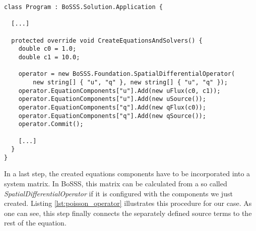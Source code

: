 \begin{lstlisting}[caption=Assembly of the DG operator for the poisson 
equation, label=lst:poisson_operator]
class Program : BoSSS.Solution.Application {

  [...]
  
  protected override void CreateEquationsAndSolvers() {
    double c0 = 1.0;
    double c1 = 10.0;

    operator = new BoSSS.Foundation.SpatialDifferentialOperator(
    	new string[] { "u", "q" }, new string[] { "u", "q" });
    operator.EquationComponents["u"].Add(new uFlux(c0, c1));
    operator.EquationComponents["u"].Add(new uSource());
    operator.EquationComponents["q"].Add(new qFlux(c0));
    operator.EquationComponents["q"].Add(new qSource());
    operator.Commit();

    [...]
  }
}
\end{lstlisting}

In a last step, the created equations components have to be incorporated into
a system matrix. In BoSSS, this matrix can be calculated from a so called
\emph{SpatialDifferentialOperator} if it is configured with the components we
just created. Listing \ref{lst:poisson_operator} illustrates this procedure 
for our case. As one can see, this step finally connects the separately defined
source terms to the rest of the equation.